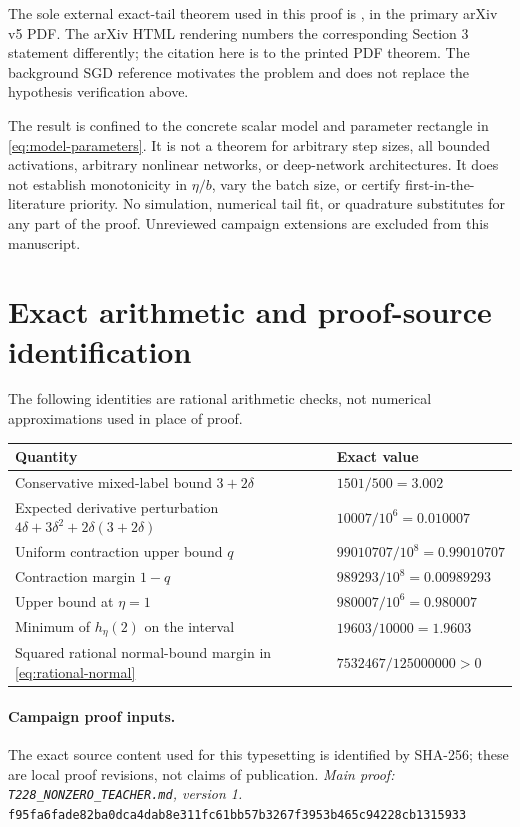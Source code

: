 \documentclass[11pt,a4paper]{article}
\numberwithin{equation}{section}
\theoremstyle{remark}
\newcommand{\sourcehash}[1]{{\small\texttt{#1}}}
\begin{document}
The sole external exact-tail theorem used in this proof is
\cite[Theorem 3.1]{JO2012Thm31}, in the primary arXiv v5 PDF. The arXiv
HTML rendering numbers the corresponding Section 3 statement differently;
the citation here is to the printed PDF theorem. The background
SGD reference \cite{Gurbuzbalaban2021} motivates the problem and does not
replace the hypothesis verification above.

The result is confined to the concrete scalar model and parameter
rectangle in \eqref{eq:model-parameters}. It is not a theorem for arbitrary
step sizes, all bounded activations, arbitrary nonlinear networks, or
deep-network architectures. It does not establish monotonicity in
$\eta/b$, vary the batch size, or certify first-in-the-literature priority.
No simulation, numerical tail fit, or quadrature substitutes for any part
of the proof. Unreviewed campaign extensions are excluded from this
manuscript.

\appendix
\section{Exact arithmetic and proof-source identification}\label{app:provenance}

The following identities are rational arithmetic checks, not numerical
approximations used in place of proof.
\begin{center}
\small
\begin{tabularx}{\textwidth}{@{}X>{\raggedleft\arraybackslash}p{}@{}}
\toprule
Quantity & Exact value \\
\midrule
Conservative mixed-label bound $3+2\delta$ & $1501/500=3.002$ \\
Expected derivative perturbation $4\delta+3\delta^2+2\delta(3+2\delta)$
 & $10007/10^6=0.010007$ \\
Uniform contraction upper bound $q$ & $99010707/10^8=0.99010707$ \\
Contraction margin $1-q$ & $989293/10^8=0.00989293$ \\
Upper bound at $\eta=1$ & $980007/10^6=0.980007$ \\
Minimum of $h_\eta(2)$ on the interval & $19603/10000=1.9603$ \\
Squared rational normal-bound margin in \eqref{eq:rational-normal}
 & $7532467/125000000>0$ \\
\bottomrule
\end{tabularx}
\end{center}

\paragraph{Campaign proof inputs.}
The exact source content used for this typesetting is identified by
SHA-256; these are local proof revisions, not claims of publication.
\noindent\emph{Main proof: \texttt{T228\_NONZERO\_TEACHER.md}, version 1.}\\
\sourcehash{f95fa6fade82ba0dca4dab8e311fc61bb57b3267f3953b465c94228cb1315933}
\end{document}
